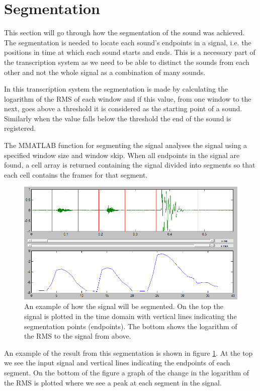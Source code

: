 \section{Segmentation}
This section will go through how the segmentation of the sound was achieved. The segmentation is needed to locate each sound's endpoints in a signal, i.e. the positions in time at which each sound starts and ends. This is a necessary part of the transcription system as we need to be able to distinct the sounds from each other and not the whole signal as a combination of many sounds.

In this transcription system the segmentation is made by calculating the logarithm of the RMS of each window and if this value, from one window to the next, goes above a threshold it is considered as the starting point of a sound. Similarly when the value falls below the threshold the end of the sound is registered.

The MMATLAB function for segmenting the signal analyses the signal using a specified window size and window skip. When all endpoints in the signal are found, a cell array is returned containing the signal divided into segments so that each cell contains the frames for that segment.

\begin{figure}[h]
	\begin{center}
		\includegraphics[scale =  0.4]{fig/SegmentationPic.png}
		\caption{An example of how the signal will be segmented. On the top the signal is plotted in the time domain with vertical lines indicating the segmentation points (endpoints). The bottom shows the logarithm of the RMS to the signal from above.}
		\label{SegmentationPic}
	\end{center}
\end{figure}

An example of the result from this segmentation is shown in figure \ref{SegmentationPic}. At the top we see the input signal and vertical lines indicating the endpoints of each segment. On the bottom of the figure a graph of the change in the logarithm of the RMS is plotted where we see a peak at each segment in the signal.